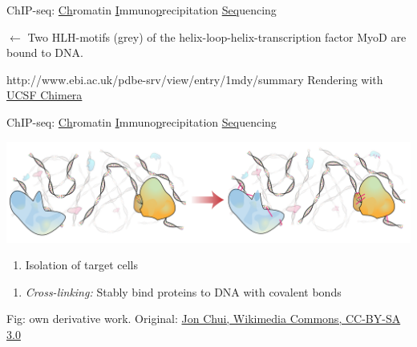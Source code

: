 \documentclass[10pt]{beamer}
\newcommand{\credit}[1]{{\vspace{\fill} \par \raggedleft \scriptsize \mdseries \color{mDarkBrown} #1 \par}}
\begin{document}
\begin{frame}{ChIP-seq: \underline{Ch}romatin \underline{I}mmuno\underline{p}recipitation \underline{Seq}uencing}
\begin{minipage}{.53\linewidth}
\begin{itemize}
		\end{itemize}
		\vspace{2em}
		{\begin{flushleft}
				\scriptsize $\leftarrow$ Two HLH-motifs (grey) of the  helix-loop-helix-transcription factor MyoD are bound to DNA.\end{flushleft}}
	\end{minipage}%
	\credit{\begin{flushleft}
			http://www.ebi.ac.uk/pdbe-srv/view/entry/1mdy/summary \linebreak Rendering with \href{http://www.cgl.ucsf.edu/chimera/ }{UCSF Chimera} \end{flushleft}}
\end{frame}

\begin{frame}{ChIP-seq: \underline{Ch}romatin \underline{I}mmuno\underline{p}recipitation \underline{Seq}uencing}
	\vspace{3em}
	\begin{center}
		\includegraphics[width=\textwidth]{./figures/ChIPseq1.png}
	\end{center}
	\begin{minipage}[t]{.49\linewidth}
		\begin{enumerate}
			\item {Isolation of target cells}
		\end{enumerate}
	\end{minipage}
	\begin{minipage}[t]{.49\linewidth}
		\begin{enumerate}
			\item { \textit{Cross-linking:} Stably bind proteins to DNA with covalent bonds}
		\end{enumerate}
	\end{minipage}
	\credit{Fig: own derivative work. Original: \href{http://commons.wikimedia.org/wiki/File:Chromatin\_immunoprecipitation\_sequencing.svg}{Jon Chui, Wikimedia Commons, CC-BY-SA 3.0}}
\end{frame}
\end{document}
